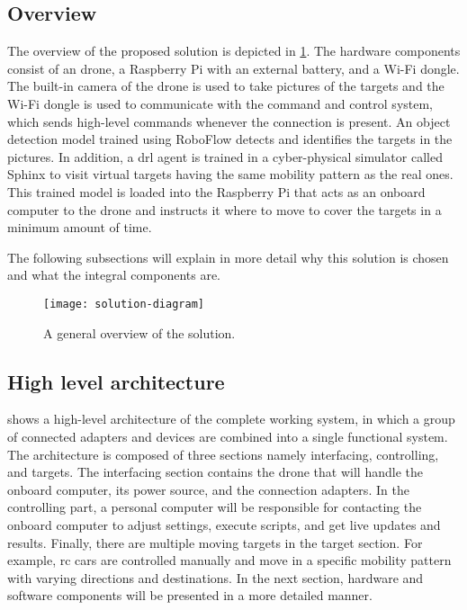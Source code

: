 \documentclass[../main.tex]{subfiles}
\begin{document}
\subsection{Overview}

The overview of the proposed solution is depicted in 
\cref{fig:solution-overview}. 
The hardware components consist of an \anafi drone,
a Raspberry Pi with an external battery, and a Wi-Fi
dongle. The built-in camera of the drone is used to
take pictures of the targets and the Wi-Fi dongle
is used to communicate with the command and control
system, which sends high-level commands whenever the
connection is present. An object detection model trained
using RoboFlow detects and identifies the targets in the
pictures. In addition, a \gls{drl} agent is trained 
in a cyber-physical simulator called Sphinx to
visit virtual targets having the same mobility pattern as the
real ones.
This trained model is loaded into the Raspberry Pi that acts
as an onboard computer to the \anafi drone and instructs
it where to move to cover the targets in a minimum amount
of time.

The following subsections will
explain in more detail why this solution is chosen
and what the integral components are.

\begin{figure}[tbp]
	\centering
	\texttt{[image: solution-diagram]}
	\caption{A general overview of the solution.}
	\label{fig:solution-overview}
\end{figure}

\subsection{High level architecture}

 shows a high-level architecture 
of the complete working system, in which a group 
of connected adapters and devices are combined into 
a single functional system. 
The architecture is composed of three sections namely
interfacing, controlling, and targets. 
The interfacing section contains the drone that 
will handle the onboard computer, its power source, 
and the connection adapters. 
In the controlling part, a personal computer 
will be responsible for contacting the onboard computer 
to adjust settings, execute scripts, and get 
live updates and results. 
Finally, there are multiple moving targets 
in the target section. For example, 
\gls{rc} cars are controlled manually and move in 
a specific mobility pattern with varying directions 
and destinations. 
In the next section, hardware and software components 
will be presented in a more detailed manner.
\end{document}
